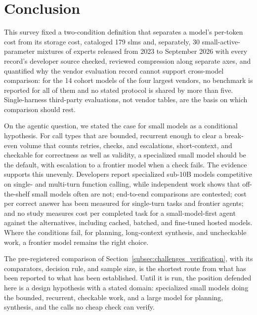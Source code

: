 \section{Conclusion}
\label{section:conclusion}

This survey fixed a two-condition definition that separates a model's per-token cost from its storage cost, cataloged 179 \glspl{slm} and, separately, 30 small-active-parameter mixtures of experts released from 2023 to September 2026 with every record's developer source checked, reviewed compression along separate axes, and quantified why the vendor evaluation record cannot support cross-model comparison: for the 14 cohort models of the four largest vendors, no benchmark is reported for all of them and no stated protocol is shared by more than five. Single-harness third-party evaluations, not vendor tables, are the basis on which comparison should rest.

On the agentic question, we stated the case for small models as a conditional hypothesis. For call types that are bounded, recurrent enough to clear a break-even volume that counts retries, checks, and escalations, short-context, and checkable for correctness as well as validity, a specialized small model should be the default, with escalation to a frontier model when a check fails. The evidence supports this unevenly. Developers report specialized sub-10B models competitive on single- and multi-turn function calling, while independent work shows that off-the-shelf small models often are not; end-to-end comparisons are contested; cost per correct answer has been measured for single-turn tasks and frontier agents; and no study measures cost per completed task for a small-model-first agent against the alternatives, including cached, batched, and fine-tuned hosted models. Where the conditions fail, for planning, long-context synthesis, and uncheckable work, a frontier model remains the right choice.

The pre-registered comparison of Section~\ref{subsec:challenges_verification}, with its comparators, decision rule, and sample size, is the shortest route from what has been reported to what has been established. Until it is run, the position defended here is a design hypothesis with a stated domain: specialized small models doing the bounded, recurrent, checkable work, and a large model for planning, synthesis, and the calls no cheap check can verify.
